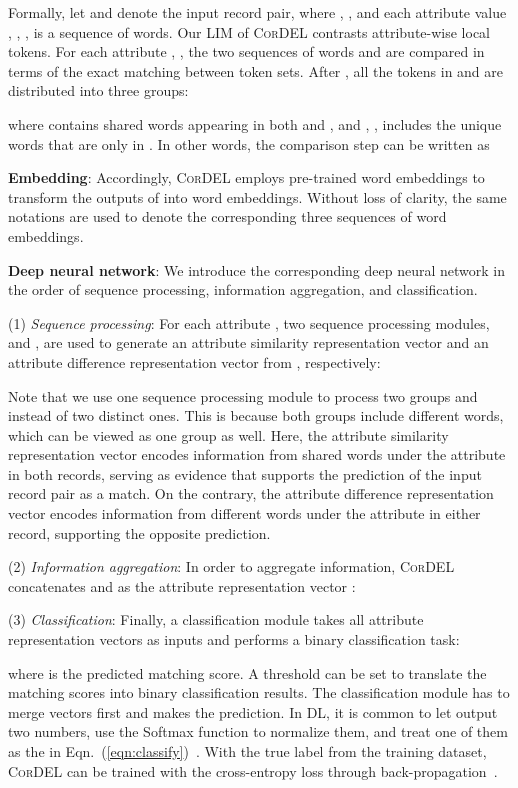 \documentclass[conference]{IEEEtran}
\begin{document}
Formally, let  and  denote the input record pair, where , , and each attribute value , , , is a sequence of words. Our LIM  of \textsc{CorDEL} contrasts attribute-wise local tokens. For each attribute , , the two sequences of words  and  are compared in terms of the exact matching between token sets. After  , all the tokens in  and  are distributed into three groups:

where  contains shared words appearing in both  and , and , , includes the unique words that are only in . In other words, the comparison step  can be written as


\textbf{Embedding}: Accordingly, \textsc{CorDEL} employs pre-trained word embeddings to transform the outputs of  into word embeddings. Without loss of clarity, the same notations  are used to denote the corresponding three sequences of word embeddings.

\textbf{Deep neural network}: We introduce the corresponding deep neural network in the order of sequence processing, information aggregation, and classification.

(1) \textit{Sequence processing}: For each attribute , two sequence processing modules,  and , are used to generate an attribute similarity representation vector  and an attribute difference representation vector  from , respectively:

Note that we use one sequence processing module  to process two groups  and  instead of two distinct ones. This is because both groups include different words, which can be viewed as one group as well. Here, the attribute similarity representation vector  encodes information from shared words under the attribute  in both records, serving as evidence that supports the prediction of the input record pair as a match. On the contrary, the attribute difference representation vector  encodes information from different words under the attribute  in either record, supporting the opposite prediction.

(2) \textit{Information aggregation}: In order to aggregate information, \textsc{CorDEL} concatenates  and  as the attribute representation vector :


(3) \textit{Classification}: Finally, a classification module  takes all  attribute representation vectors as inputs and performs a binary classification task:

where  is the predicted matching score. A threshold can be set to translate the matching scores into binary classification results. The classification module  has to merge  vectors first and makes the prediction. In DL, it is common to let  output two numbers, use the Softmax function to normalize them, and treat one of them as the  in Eqn.~(\ref{eqn:classify})~\cite{bishop2006pattern}. With the true label  from the training dataset, \textsc{CorDEL} can be trained with the cross-entropy loss through back-propagation~\cite{lecun1998gradient}.
\end{document}

